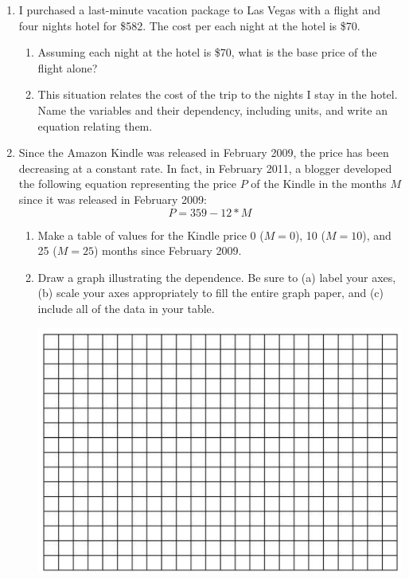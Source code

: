 \documentclass[12pt]{article}
\begin{document}
\begin{enumerate}

\item I purchased a last-minute vacation package to Las Vegas with a flight and four nights hotel for \$582.  The cost per each night at the hotel is \$70.  

\begin{enumerate}
\item Assuming each night at the hotel is \$70, what is the base price of the flight alone?
\vfill

\item This situation relates the cost of the trip to the nights I stay in the hotel. Name the variables and their dependency, including units, and write an equation relating them.
\vfill
\vfill
\end{enumerate}

\newpage %
\item Since the Amazon Kindle was released in February 2009, the price has been decreasing at a constant rate.  In fact, in February 2011, a blogger developed the following equation representing the price $P$ of the Kindle in the months $M$ since it was released in February 2009: $$ P = 359 - 12 * M $$

\begin{enumerate}
\item Make a table of values for the Kindle price 0 ($M=0$), 10 ($M=10$), and 25 ($M=25$) months since February 2009.
\vfill
\item Draw a graph illustrating the dependence.  Be sure to (a) label your axes, (b) scale your axes appropriately to fill the entire graph paper, and (c) include all of the data in your table.

\begin{center}
 {\includegraphics [width = 6in] {../graphPaper}}
\end{center}
\vspace{.1in}


\end{enumerate}
\end{enumerate}
\end{document}
